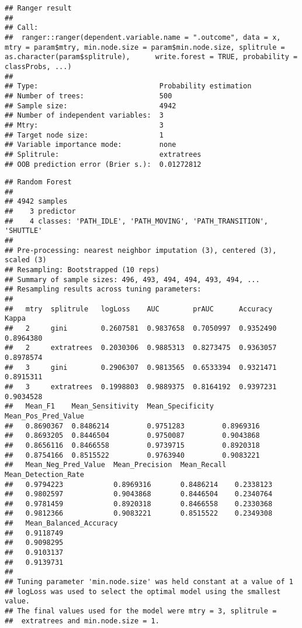 \documentclass[]{article}
\begin{document}
\begin{verbatim}
## Ranger result
## 
## Call:
##  ranger::ranger(dependent.variable.name = ".outcome", data = x,      mtry = param$mtry, min.node.size = param$min.node.size, splitrule = as.character(param$splitrule),      write.forest = TRUE, probability = classProbs, ...) 
## 
## Type:                             Probability estimation 
## Number of trees:                  500 
## Sample size:                      4942 
## Number of independent variables:  3 
## Mtry:                             3 
## Target node size:                 1 
## Variable importance mode:         none 
## Splitrule:                        extratrees 
## OOB prediction error (Brier s.):  0.01272812
\end{verbatim}

\begin{verbatim}
## Random Forest 
## 
## 4942 samples
##    3 predictor
##    4 classes: 'PATH_IDLE', 'PATH_MOVING', 'PATH_TRANSITION', 'SHUTTLE' 
## 
## Pre-processing: nearest neighbor imputation (3), centered (3), scaled (3) 
## Resampling: Bootstrapped (10 reps) 
## Summary of sample sizes: 496, 493, 494, 494, 493, 494, ... 
## Resampling results across tuning parameters:
## 
##   mtry  splitrule   logLoss    AUC        prAUC      Accuracy   Kappa    
##   2     gini        0.2607581  0.9837658  0.7050997  0.9352490  0.8964380
##   2     extratrees  0.2030306  0.9885313  0.8273475  0.9363057  0.8978574
##   3     gini        0.2906307  0.9813565  0.6533394  0.9321471  0.8915311
##   3     extratrees  0.1998803  0.9889375  0.8164192  0.9397231  0.9034528
##   Mean_F1    Mean_Sensitivity  Mean_Specificity  Mean_Pos_Pred_Value
##   0.8690367  0.8486214         0.9751283         0.8969316          
##   0.8693205  0.8446504         0.9750087         0.9043868          
##   0.8656116  0.8466558         0.9739715         0.8920318          
##   0.8754166  0.8515522         0.9763940         0.9083221          
##   Mean_Neg_Pred_Value  Mean_Precision  Mean_Recall  Mean_Detection_Rate
##   0.9794223            0.8969316       0.8486214    0.2338123          
##   0.9802597            0.9043868       0.8446504    0.2340764          
##   0.9781459            0.8920318       0.8466558    0.2330368          
##   0.9812366            0.9083221       0.8515522    0.2349308          
##   Mean_Balanced_Accuracy
##   0.9118749             
##   0.9098295             
##   0.9103137             
##   0.9139731             
## 
## Tuning parameter 'min.node.size' was held constant at a value of 1
## logLoss was used to select the optimal model using the smallest value.
## The final values used for the model were mtry = 3, splitrule =
##  extratrees and min.node.size = 1.
\end{verbatim}
\end{document}
